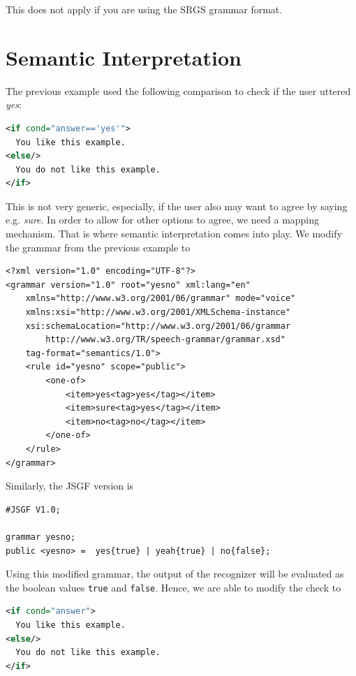 \documentclass[11pt,a4paper]{book}
\begin{document}
This does not apply if you are using the SRGS grammar format.

\section{Semantic Interpretation}
\label{sec:semantic-interpretation}

The previous example used the following comparison to check if the user uttered
\emph{yes}:

\begin{lstlisting}[language=XML]
<if cond="answer=='yes'">
  You like this example.
<else/>
  You do not like this example.
</if>
\end{lstlisting}

This is not very generic, especially, if the user also may want to agree by
saying e.g. \emph{sure}. In order to allow for other options to agree, we need
a mapping mechanism. That is where semantic interpretation comes into play. We
modify the grammar from the previous example to

\begin{lstlisting}
<?xml version="1.0" encoding="UTF-8"?>
<grammar version="1.0" root="yesno" xml:lang="en"
    xmlns="http://www.w3.org/2001/06/grammar" mode="voice"
    xmlns:xsi="http://www.w3.org/2001/XMLSchema-instance"
    xsi:schemaLocation="http://www.w3.org/2001/06/grammar
        http://www.w3.org/TR/speech-grammar/grammar.xsd"
    tag-format="semantics/1.0">
    <rule id="yesno" scope="public">
        <one-of>
            <item>yes<tag>yes</tag></item>
            <item>sure<tag>yes</tag></item>
            <item>no<tag>no</tag></item>
        </one-of>
    </rule>
</grammar>
\end{lstlisting}

Similarly, the JSGF version is

\begin{lstlisting}
#JSGF V1.0;

grammar yesno;
public <yesno> =  yes{true} | yeah{true} | no{false};
\end{lstlisting}

Using this modified grammar, the output of the recognizer will be evaluated
as the boolean values \lstinline{true} and \lstinline{false}. Hence, we are
able to modify the check to

\begin{lstlisting}[language=XML]
<if cond="answer">
  You like this example.
<else/>
  You do not like this example.
</if>
\end{lstlisting}
\end{document}
